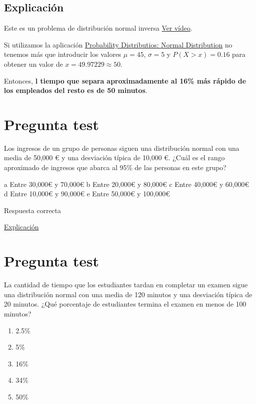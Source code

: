 \documentclass[
]{book}
\providecommand{\tightlist}{%
  \setlength{\itemsep}{0pt}\setlength{\parskip}{0pt}}
\begin{document}
\hypertarget{explicaciuxf3n}{%
\subsection{Explicación}\label{explicaciuxf3n}}

Este es un problema de distribución normal inversa \href{https://youtu.be/BqGHUqC4cdQ}{Ver vídeo}.

Si utilizamos la aplicación \href{https://homepage.divms.uiowa.edu/~mbognar/applets/normal.html}{Probability Distributios: Normal Distribution} no tenemos más que introducir los valores \(\mu = 45\), \(\sigma = 5\) y \(P(X > x)= 0.16\) para obtener un valor de \(x = 49.97229 \approx 50\).

Entonces, \textbf{l tiempo que separa aproximadamente al 16\% más rápido de los empleados del resto es de 50 minutos}.

\hypertarget{pregunta-test-114}{%
\section{Pregunta test}\label{pregunta-test-114}}

Los ingresos de un grupo de personas siguen una distribución normal con una media de 50,000 € y una desviación típica de 10,000 €. ¿Cuál es el rango aproximado de ingresos que abarca al 95\% de las personas en este grupo?

a Entre 30,000€ y 70,000€
b Entre 20,000€ y 80,000€
c Entre 40,000€ y 60,000€
d Entre 10,000€ y 90,000€
e Entre 50,000€ y 100,000€

Respuesta correcta

\href{https://youtu.be/TjZvZVxItLc}{Explicación}

\hypertarget{pregunta-test-115}{%
\section{Pregunta test}\label{pregunta-test-115}}

La cantidad de tiempo que los estudiantes tardan en completar un examen sigue una distribución normal con una media de 120 minutos y una desviación típica de 20 minutos. ¿Qué porcentaje de estudiantes termina el examen en menos de 100 minutos?

\begin{enumerate}
\def\labelenumi{\alph{enumi})}
\tightlist
\item
  2.5\%
\item
  5\%
\item
  16\%
\item
  34\%
\item
  50\%
\end{enumerate}
\end{document}
